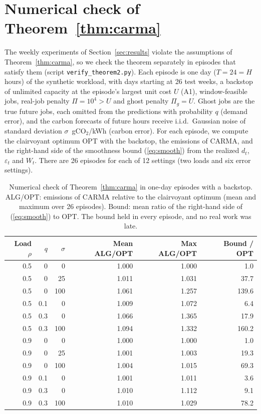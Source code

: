 \section{Numerical check of Theorem~\ref{thm:carma}}\label{app:thm2check}

The weekly experiments of Section~\ref{sec:results} violate the assumptions of Theorem~\ref{thm:carma}, so we check the theorem separately in episodes that satisfy them (script \texttt{verify\_theorem2.py}). Each episode is one day ($T=24=H$ hours) of the synthetic workload, with days starting at 26 test weeks, a backstop of unlimited capacity at the episode's largest unit cost $U$ (A1), window-feasible jobs, real-job penalty $\Pi=10^4>U$ and ghost penalty $\Pi_g=U$. Ghost jobs are the true future jobs, each omitted from the predictions with probability $q$ (demand error), and the carbon forecasts of future hours receive i.i.d.\ Gaussian noise of standard deviation $\sigma$~gCO$_2$/kWh (carbon error). For each episode, we compute the clairvoyant optimum OPT with the backstop, the emissions of CARMA, and the right-hand side of the smoothness bound (\ref{eq:smooth}) from the realized $d_t$, $\varepsilon_t$ and $W_t$. There are 26 episodes for each of 12 settings (two loads and six error settings).

\begin{table}[!htbp]
\centering
\caption{Numerical check of Theorem~\ref{thm:carma} in one-day episodes with a backstop. ALG/OPT: emissions of CARMA relative to the clairvoyant optimum (mean and maximum over 26 episodes). Bound: mean ratio of the right-hand side of (\ref{eq:smooth}) to OPT. The bound held in every episode, and no real work was late.}
\label{tab:thm2}
\small
\begin{tabular}{rrrrrr}
\toprule
Load $\rho$ & $q$ & $\sigma$ & Mean ALG/OPT & Max ALG/OPT & Bound / OPT \\
\midrule
0.5 & 0 & 0 & 1.000 & 1.000 & 1.0 \\
0.5 & 0 & 25 & 1.011 & 1.031 & 37.7 \\
0.5 & 0 & 100 & 1.061 & 1.257 & 139.6 \\
0.5 & 0.1 & 0 & 1.009 & 1.072 & 6.4 \\
0.5 & 0.3 & 0 & 1.066 & 1.365 & 17.9 \\
0.5 & 0.3 & 100 & 1.094 & 1.332 & 160.2 \\
0.9 & 0 & 0 & 1.000 & 1.000 & 1.0 \\
0.9 & 0 & 25 & 1.001 & 1.003 & 19.3 \\
0.9 & 0 & 100 & 1.004 & 1.015 & 69.3 \\
0.9 & 0.1 & 0 & 1.001 & 1.011 & 3.6 \\
0.9 & 0.3 & 0 & 1.010 & 1.112 & 9.1 \\
0.9 & 0.3 & 100 & 1.010 & 1.029 & 78.2 \\
\bottomrule
\end{tabular}
\end{table}

